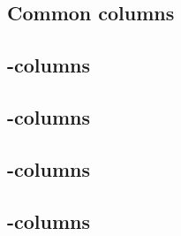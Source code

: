 \subsection{Common columns          \lispTodo{}}  
\subsection{\computation{}-columns  \lispTodo{}}  
\subsection{\macro{}-columns        \lispTodo{}}  
\subsection{\extern{}-columns       \lispTodo{}}  
\subsection{\utils{}-columns        \lispTodo{}}  
